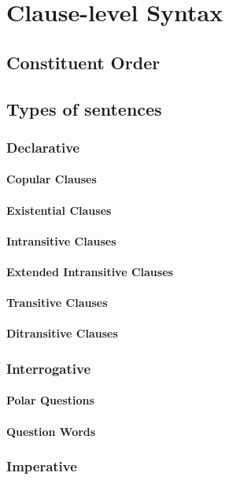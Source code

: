 \documentclass[a4paper, 12pt, oneside]{memoir}
\begin{document}
\chapter{Clause-level Syntax}
\section{Constituent Order}
\section{Types of sentences}
\subsection{Declarative}
\subsubsection{Copular Clauses}
\subsubsection{Existential Clauses}
\subsubsection{Intransitive Clauses}
\subsubsection{Extended Intransitive Clauses}
\subsubsection{Transitive Clauses}
\subsubsection{Ditransitive Clauses}
\subsection{Interrogative}
\subsubsection{Polar Questions}
\subsubsection{Question Words}
\subsection{Imperative}
\end{document}
